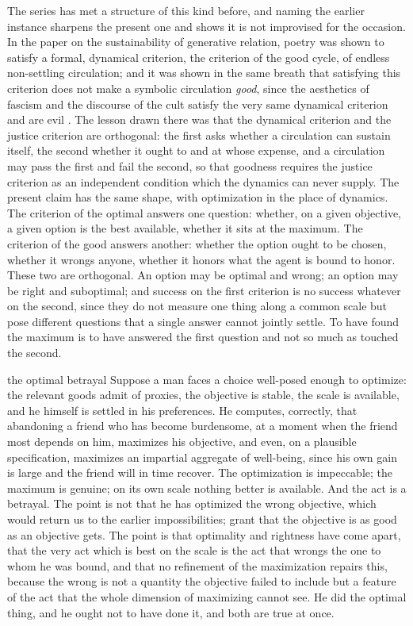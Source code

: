 The series has met a structure of this kind before, and naming the earlier instance sharpens the present one and shows it is not improvised for the occasion. In the paper on the sustainability of generative relation, poetry was shown to satisfy a formal, dynamical criterion, the criterion of the good cycle, of endless non-settling circulation; and it was shown in the same breath that satisfying this criterion does not make a symbolic circulation \emph{good}, since the aesthetics of fascism and the discourse of the cult satisfy the very same dynamical criterion and are evil \parencite{paperix}. The lesson drawn there was that the dynamical criterion and the justice criterion are orthogonal: the first asks whether a circulation can sustain itself, the second whether it ought to and at whose expense, and a circulation may pass the first and fail the second, so that goodness requires the justice criterion as an independent condition which the dynamics can never supply. The present claim has the same shape, with optimization in the place of dynamics. The criterion of the optimal answers one question: whether, on a given objective, a given option is the best available, whether it sits at the maximum. The criterion of the good answers another: whether the option ought to be chosen, whether it wrongs anyone, whether it honors what the agent is bound to honor. These two are orthogonal. An option may be optimal and wrong; an option may be right and suboptimal; and success on the first criterion is no success whatever on the second, since they do not measure one thing along a common scale but pose different questions that a single answer cannot jointly settle. To have found the maximum is to have answered the first question and not so much as touched the second.

\begin{casebox}{the optimal betrayal}
Suppose a man faces a choice well-posed enough to optimize: the relevant goods admit of proxies, the objective is stable, the scale is available, and he himself is settled in his preferences. He computes, correctly, that abandoning a friend who has become burdensome, at a moment when the friend most depends on him, maximizes his objective, and even, on a plausible specification, maximizes an impartial aggregate of well-being, since his own gain is large and the friend will in time recover. The optimization is impeccable; the maximum is genuine; on its own scale nothing better is available. And the act is a betrayal. The point is not that he has optimized the wrong objective, which would return us to the earlier impossibilities; grant that the objective is as good as an objective gets. The point is that optimality and rightness have come apart, that the very act which is best on the scale is the act that wrongs the one to whom he was bound, and that no refinement of the maximization repairs this, because the wrong is not a quantity the objective failed to include but a feature of the act that the whole dimension of maximizing cannot see. He did the optimal thing, and he ought not to have done it, and both are true at once.
\end{casebox}

